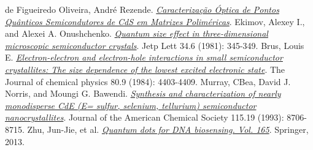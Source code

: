  de Figueiredo Oliveira, André Rezende. \href{http://www.infis.ufu.br/sites/infis.ufu.br/files/Anexos/Bookpage/TCC%20F%C3%8DSICA%20DE%20MATERIAIS%202009_2%20-%20ANDRE%20REZENDE.pdf}
{\it Caracterização Óptica de Pontos Quânticos Semicondutores de CdS em Matrizes Poliméricas}. 
 Ekimov, Alexey I., and Alexei A. Onushchenko. \href{https://www.researchgate.net/profile/Alexey_Onushchehko/publication/234289541_Quantum_Size_Effect_in_Three-Dimensional_Microscopic_Semiconductor_Crystals/links/0c9605305fa93c4e3d000000.pdf}{\it Quantum size effect in three-dimensional microscopic semiconductor crystals}. Jetp Lett 34.6 (1981): 345-349.
 Brus, Louis E. \href{http://aip.scitation.org/doi/10.1063/1.447218}{\it Electron-electron and electron-hole interactions in small semiconductor crystallites: The size dependence of the lowest excited electronic state}. The Journal of chemical physics 80.9 (1984): 4403-4409.
 Murray, CBea, David J. Norris, and Moungi G. Bawendi. \href{http://pubs.acs.org/doi/abs/10.1021/ja00072a025?journalCode=jacsat}{\it Synthesis and characterization of nearly monodisperse CdE (E= sulfur, selenium, tellurium) semiconductor nanocrystallites}. Journal of the American Chemical Society 115.19 (1993): 8706-8715.
 Zhu, Jun-Jie, et al. \href{https://link.springer.com/book/10.1007/978-3-642-44910-9}{\it Quantum dots for DNA biosensing. Vol. 165}. Springer, 2013.

